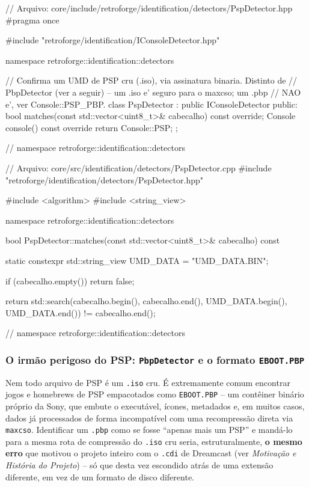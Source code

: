 \begin{CaixaCodigo}
// Arquivo: core/include/retroforge/identification/detectors/PspDetector.hpp
#pragma once

#include "retroforge/identification/IConsoleDetector.hpp"

namespace retroforge::identification::detectors {

// Confirma um UMD de PSP cru (.iso), via assinatura binaria. Distinto de
// PbpDetector (ver a seguir) -- um .iso e' seguro para o maxcso; um .pbp
// NAO e', ver Console::PSP_PBP.
class PspDetector : public IConsoleDetector {
public:
    bool matches(const std::vector<uint8_t>& cabecalho) const override;
    Console console() const override { return Console::PSP; }
};

} // namespace retroforge::identification::detectors
\end{CaixaCodigo}

\begin{CaixaCodigo}
// Arquivo: core/src/identification/detectors/PspDetector.cpp
#include "retroforge/identification/detectors/PspDetector.hpp"

#include <algorithm>
#include <string_view>

namespace retroforge::identification::detectors {

bool PspDetector::matches(const std::vector<uint8_t>& cabecalho) const {
    static constexpr std::string_view UMD_DATA = "UMD_DATA.BIN";

    if (cabecalho.empty()) {
        return false;
    }

    return std::search(cabecalho.begin(), cabecalho.end(), UMD_DATA.begin(),
                        UMD_DATA.end()) != cabecalho.end();
}

} // namespace retroforge::identification::detectors
\end{CaixaCodigo}

\subsubsection{O irmão perigoso do PSP: \texttt{PbpDetector} e o formato \texttt{EBOOT.PBP}}
\label{sec:pbp-detector}

Nem todo arquivo de PSP é um \texttt{.iso} cru. É extremamente comum encontrar jogos e homebrews de PSP empacotados como \texttt{EBOOT.PBP} -- um contêiner binário próprio da Sony, que embute o executável, ícones, metadados e, em muitos casos, dados já processados de forma incompatível com uma recompressão direta via \texttt{maxcso}. Identificar um \texttt{.pbp} como se fosse ``apenas mais um PSP'' e mandá-lo para a mesma rota de compressão do \texttt{.iso} cru seria, estruturalmente, \textbf{o mesmo erro} que motivou o projeto inteiro com o \texttt{.cdi} de Dreamcast (ver \textit{Motivação e História do Projeto}) -- só que desta vez escondido atrás de uma extensão diferente, em vez de um formato de disco diferente.

